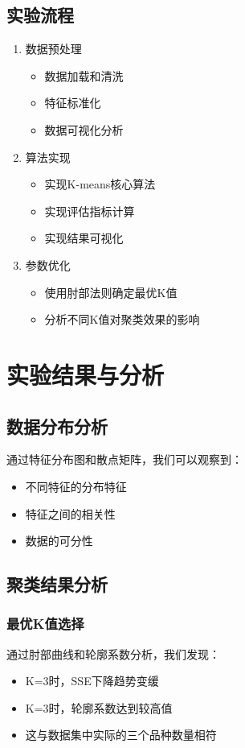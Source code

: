 \documentclass[12pt, a4paper]{article}
\begin{document}
\subsection{实验流程}
\begin{enumerate}
    \item 数据预处理
    \begin{itemize}
        \item 数据加载和清洗
        \item 特征标准化
        \item 数据可视化分析
    \end{itemize}
    
    \item 算法实现
    \begin{itemize}
        \item 实现K-means核心算法
        \item 实现评估指标计算
        \item 实现结果可视化
    \end{itemize}
    
    \item 参数优化
    \begin{itemize}
        \item 使用肘部法则确定最优K值
        \item 分析不同K值对聚类效果的影响
    \end{itemize}
\end{enumerate}

\section{实验结果与分析}
\subsection{数据分布分析}
通过特征分布图和散点矩阵，我们可以观察到：
\begin{itemize}
    \item 不同特征的分布特征
    \item 特征之间的相关性
    \item 数据的可分性
\end{itemize}

\subsection{聚类结果分析}
\subsubsection{最优K值选择}
通过肘部曲线和轮廓系数分析，我们发现：
\begin{itemize}
    \item K=3时，SSE下降趋势变缓
    \item K=3时，轮廓系数达到较高值
    \item 这与数据集中实际的三个品种数量相符
\end{itemize}
\end{document}
